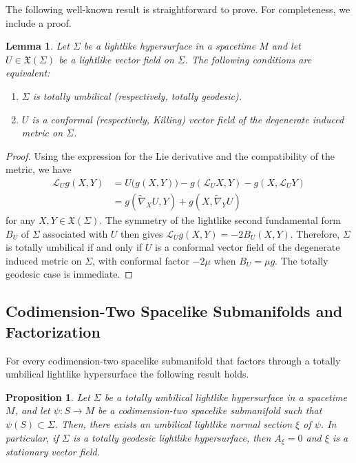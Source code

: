 \documentclass[11pt]{article}
\numberwithin{equation}{section}
\newtheorem{lemma}[theorem]{Lemma}
\newtheorem{proposition}[theorem]{Proposition}
\begin{document}
	
	
	
	
	
	The following well-known result is straightforward to prove. For completeness, we include a proof. 
	
	\begin{lemma}\label{lemmaULH} 
		Let $\Sigma$ be a lightlike hypersurface in a spacetime $M$ and let $U \in {\mathfrak X}(\Sigma)$ be a lightlike vector field on $\Sigma$. The following conditions are equivalent:
		\begin{enumerate}
			\item $\Sigma$ is totally umbilical (respectively, totally geodesic).
			\item $U$ is a conformal (respectively, Killing) vector field of the degenerate induced metric on $\Sigma$.
		\end{enumerate}
	\end{lemma}
\begin{proof}
	Using the expression for the Lie derivative and the compatibility of the metric, we have
	\begin{align*}
		\mathscr{L}_U g(X,Y) &= U\bigl(g(X,Y)\bigr) - g(\mathscr{L}_U X, Y) - g(X, \mathscr{L}_U Y) \\
		&= g(\widetilde{\nabla}_X U, Y) + g(X, \widetilde{\nabla}_Y U)
	\end{align*}
	for any $X, Y \in {\mathfrak X}(\Sigma)$. The symmetry of the lightlike second fundamental form $B_U$ of $\Sigma$ associated with $U$ then gives $
	\mathscr{L}_U g(X,Y) = -2 B_U(X,Y).$
	Therefore, $\Sigma$ is totally umbilical if and only if $U$ is a conformal vector field of the degenerate induced metric on $\Sigma$, with conformal factor $-2\mu$ when $B_U = \mu g$. The totally geodesic case is immediate.
\end{proof}
	
	
	
	
	\subsection{Codimension-Two Spacelike Submanifolds and Factorization}
	For every codimension-two spacelike  submanifold  that factors through a totally umbilical lightlike hypersurface the following result holds.
	
\begin{proposition}\label{ImpliFacil}
	Let $\Sigma$ be a totally umbilical lightlike hypersurface in a spacetime $M$, and let $\psi\colon S \to M$ be a codimension-two spacelike submanifold such that $\psi(S) \subset \Sigma$. Then, there exists an umbilical lightlike normal section $\xi$ of $\psi$. In particular, if $\Sigma$ is a totally geodesic lightlike hypersurface, then $A_{\xi} = 0$ and $\xi$ is a stationary vector field.
\end{proposition}
\end{document}
